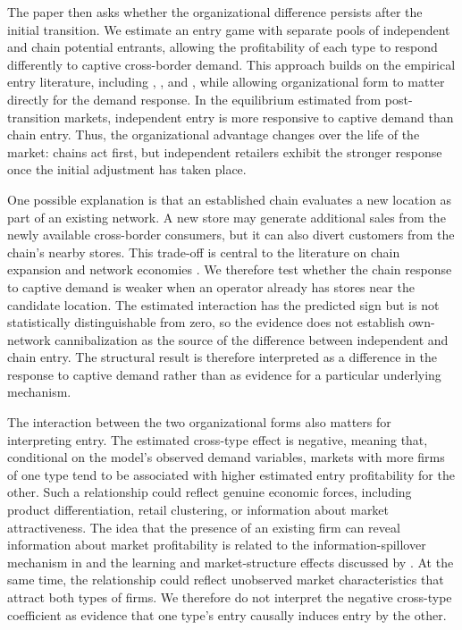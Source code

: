 \documentclass[english,12pt]{article}
\begin{document}
The paper then asks whether the organizational difference persists after the initial transition. We estimate an entry game with separate pools of independent and chain potential entrants, allowing the profitability of each type to respond differently to captive cross-border demand. This approach builds on the empirical entry literature, including \citet{BresnahanReiss1991}, \citet{Mazzeo2002}, and \citet{Seim2006}, while allowing organizational form to matter directly for the demand response. In the equilibrium estimated from post-transition markets, independent entry is more responsive to captive demand than chain entry. Thus, the organizational advantage changes over the life of the market: chains act first, but independent retailers exhibit the stronger response once the initial adjustment has taken place.

One possible explanation is that an established chain evaluates a new location as part of an existing network. A new store may generate additional sales from the newly available cross-border consumers, but it can also divert customers from the chain's nearby stores. This trade-off is central to the literature on chain expansion and network economies \citep{Nishida2008,Holmes2011,Jia2008}. We therefore test whether the chain response to captive demand is weaker when an operator already has stores near the candidate location. The estimated interaction has the predicted sign but is not statistically distinguishable from zero, so the evidence does not establish own-network cannibalization as the source of the difference between independent and chain entry. The structural result is therefore interpreted as a difference in the response to captive demand rather than as evidence for a particular underlying mechanism.

The interaction between the two organizational forms also matters for interpreting entry. The estimated cross-type effect is negative, meaning that, conditional on the model's observed demand variables, markets with more firms of one type tend to be associated with higher estimated entry profitability for the other. Such a relationship could reflect genuine economic forces, including product differentiation, retail clustering, or information about market attractiveness. The idea that the presence of an existing firm can reveal information about market profitability is related to the information-spillover mechanism in \citet{CaplinLeahy1998} and the learning and market-structure effects discussed by \citet{ToivanenWaterson2005}. At the same time, the relationship could reflect unobserved market characteristics that attract both types of firms. We therefore do not interpret the negative cross-type coefficient as evidence that one type's entry causally induces entry by the other.
\end{document}
